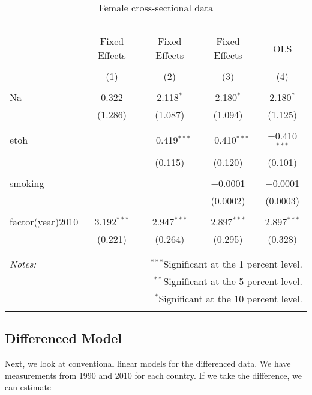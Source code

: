 \documentclass[11pt]{article}\usepackage[]{graphicx}\usepackage[]{color}
\begin{document}
\begin{table}[!htbp] \centering 
  \caption{Female cross-sectional data} 
  \label{tab:ffe} 
\begin{tabular}{@{\extracolsep{5pt}}lcccc} 
\\[-1.8ex]\hline 
\hline \\[-1.8ex] 
\\[-1.8ex] & \multicolumn{4}{c}{ } \\ 
 & Fixed Effects & Fixed Effects & Fixed Effects & OLS \\ 
\\[-1.8ex] & (1) & (2) & (3) & (4)\\ 
\hline \\[-1.8ex] 
 Na & 0.322 & 2.118$^{*}$ & 2.180$^{*}$ & 2.180$^{*}$ \\ 
  & (1.286) & (1.087) & (1.094) & (1.125) \\ 
  & & & & \\ 
 etoh &  & $-$0.419$^{***}$ & $-$0.410$^{***}$ & $-$0.410$^{***}$ \\ 
  &  & (0.115) & (0.120) & (0.101) \\ 
  & & & & \\ 
 smoking &  &  & $-$0.0001 & $-$0.0001 \\ 
  &  &  & (0.0002) & (0.0003) \\ 
  & & & & \\ 
 factor(year)2010 & 3.192$^{***}$ & 2.947$^{***}$ & 2.897$^{***}$ & 2.897$^{***}$ \\ 
  & (0.221) & (0.264) & (0.295) & (0.328) \\ 
  & & & & \\ 
\hline 
\hline \\[-1.8ex] 
\textit{Notes:} & \multicolumn{4}{r}{$^{***}$Significant at the 1 percent level.} \\ 
 & \multicolumn{4}{r}{$^{**}$Significant at the 5 percent level.} \\ 
 & \multicolumn{4}{r}{$^{*}$Significant at the 10 percent level.} \\ 
 & \multicolumn{4}{r}{} \\ 
\end{tabular} 
\end{table} 


\subsection{Differenced Model}
Next, we look at conventional linear models for the differenced data. 
We have measurements from 1990 and 2010 for each country.
If we take the difference, we can estimate
\end{document}

